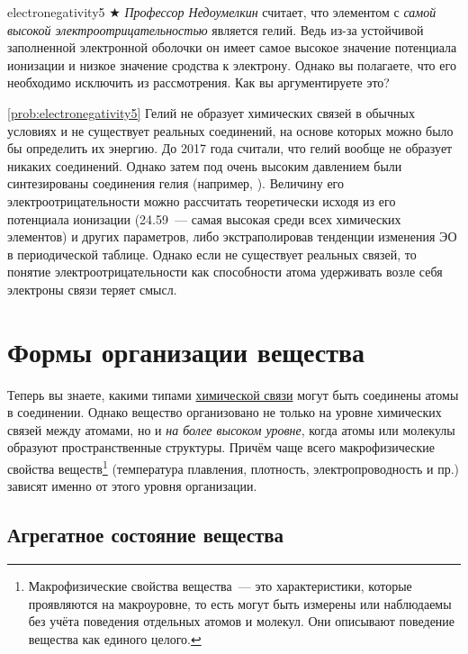 \begin{problem}{}{electronegativity5}
    $\bigstar$ \emph{Профессор Недоумелкин} считает, что элементом с \emph{самой высокой электроотрицательностью} является гелий. Ведь из-за устойчивой заполненной электронной оболочки он имеет самое высокое значение потенциала ионизации и низкое значение сродства к электрону. Однако вы полагаете, что его необходимо исключить из рассмотрения. Как вы аргументируете это?

    \begin{sol}{\ref{prob:electronegativity5}}
        Гелий не образует химических связей в обычных условиях и не существует реальных соединений, на основе которых можно было бы определить их энергию. До 2017 года считали, что гелий вообще не образует никаких соединений. Однако затем под очень высоким давлением были синтезированы соединения гелия (например, ). Величину его электроотрицательности можно рассчитать теоретически исходя из его потенциала ионизации (\qty{24,59}{\ruEV}~--- самая высокая среди всех химических элементов) и других параметров, либо экстраполировав тенденции изменения ЭО в периодической таблице. Однако если не существует реальных связей, то понятие электроотрицательности как способности атома удерживать возле себя электроны связи теряет смысл.
    \end{sol}
\end{problem}

\clearpage

\section{Формы организации вещества}

Теперь вы знаете, какими типами \hyperref[sec:introduction_to_chemical_bonding]{химической связи} могут быть соединены атомы в соединении. Однако вещество организовано не только на уровне химических связей между атомами, но и \emph{на более высоком уровне}, когда атомы или молекулы образуют пространственные структуры. Причём чаще всего макрофизические свойства веществ\footnote{Макрофизические свойства вещества~--- это характеристики, которые проявляются на макроуровне, то есть могут быть измерены или наблюдаемы без учёта поведения отдельных атомов и молекул. Они описывают поведение вещества как единого целого.} (температура плавления, плотность, электропроводность и пр.) зависят именно от этого уровня организации.

\subsection*{Агрегатное состояние вещества}

